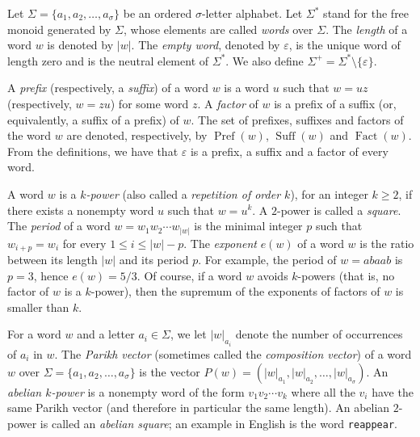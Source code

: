 \documentclass[11pt,reqno]{amsart}
\numberwithin{equation}{section}
\theoremstyle{plain}
\theoremstyle{definition}
\theoremstyle{remark}
\renewcommand{\epsilon}{\varepsilon}
\DeclareMathOperator{\Suff}{Suff}
\DeclareMathOperator{\Pref}{Pref}
\DeclareMathOperator{\Fact}{Fact}
\begin{document}
Let $\Sigma=\{a_1,a_2,\ldots,a_{\sigma}\}$ be an ordered $\sigma$-letter alphabet. Let $\Sigma^{*}$ stand for the free monoid generated by $\Sigma$, whose elements are called \emph{words} over $\Sigma$. The \emph{length} of a word $w$ is denoted by $|w|$. The \emph{empty word}, denoted by $\epsilon$, is the unique word of length zero and is the neutral element of $\Sigma^{*}$. We also define $\Sigma^{+}=\Sigma^{*}\setminus \{\epsilon\}$.
 
A \emph{prefix} (respectively, a \emph{suffix}) of a word $w$ is a word $u$ such that $w=uz$ (respectively, $w=zu$) for some word $z$. A \emph{factor} of $w$ is a prefix of a suffix (or, equivalently, a suffix of a prefix) of $w$.  
The set of prefixes, suffixes and factors of the word $w$ are denoted,
respectively, by $\Pref(w)$, $\Suff(w)$ and $\Fact(w)$.
From the definitions, we have that $\epsilon$ is a prefix, a suffix and a factor of every word. 

A word $w$ is a \emph{$k$-power} (also called a \emph{repetition of order $k$}), for an integer $k\geq 2$, if there exists a nonempty word $u$ such that $w=u^k$. A $2$-power is called a \emph{square}. The \emph{period} of a word $w=w_1w_2\cdots w_{|w|}$ is the minimal integer $p$ such that $w_{i+p}=w_i$ for every $1\leq i\leq |w|-p$. The \emph{exponent} $e(w)$ of a word $w$ is the ratio between its length $|w|$ and its period $p$. For example, the period of $w=abaab$ is $p=3$, hence $e(w)=5/3$. Of course, if a word $w$ avoids $k$-powers (that is, no factor of $w$ is a $k$-power), then the supremum of the exponents of factors of $w$ is smaller than $k$.

For a word $w$ and a letter $a_i\in \Sigma$, we let $|w|_{a_i}$ denote the number of occurrences of $a_i$ in $w$. The \emph{Parikh vector} (sometimes called the \emph{composition vector}) of a word $w$ over $\Sigma=\{a_1,a_2,\ldots,a_{\sigma}\}$ is the vector $P(w)=(|w|_{a_1},|w|_{a_2},\ldots,|w|_{a_{\sigma}})$. %
An \emph{abelian $k$-power} is a nonempty word of the form $v_1v_2\cdots v_k$ where all the $v_i$  have the same Parikh vector (and therefore in particular the same length).
An abelian $2$-power is called an \emph{abelian square}; an example in English is the word {\tt reappear}.
\end{document}
